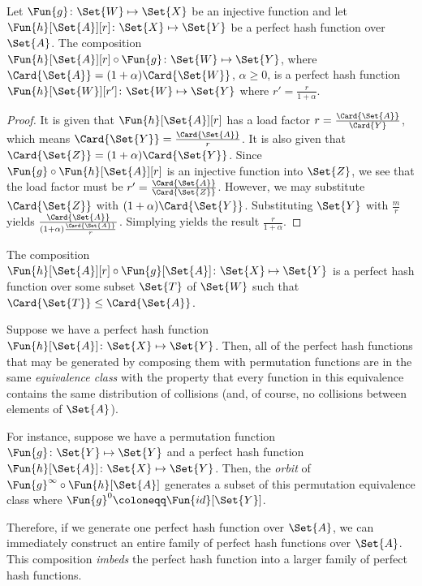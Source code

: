 \documentclass[ ../main.tex]{subfiles}
\begin{document}
\begin{theorem}
	Let $\Fun{g} \colon \Set{W} \mapsto \Set{X}$ be an injective function and let $\Fun{h}[\Set{A}][r] \colon \Set{X} 
	\mapsto \Set{Y}$ be a perfect hash function over $\Set{A}$.
	The composition $\Fun{h}[\Set{A}][r] \circ \Fun{g} \colon \Set{W} \mapsto \Set{Y}$, where $\Card{\Set{A}} = (1 + \alpha) \Card{\Set{W}}$, $\alpha \geq 0$, is a perfect hash function $\Fun{h}[\Set{W}][r'] \colon \Set{W} \mapsto \Set{Y}$ where $r' = \frac{r}{1+\alpha}$.
\end{theorem}
\begin{proof}
	It is given that $\Fun{h}[\Set{A}][r]$ has a load factor $r = \frac{\Card{\Set{A}}}{\Card{Y}}$, which means $\Card{\Set{Y}} = \frac{\Card{\Set{A}}}{r}$.
	It is also given that $\Card{\Set{Z}} = (1+\alpha) \Card{\Set{Y}}$.
	Since $\Fun{g} \circ \Fun{h}[\Set{A}][r]$ is an injective function into $\Set{Z}$, we see that the load factor must be $r' = \frac{\Card{\Set{A}}}{\Card{\Set{Z}}}$.
	However, we may substitute $\Card{\Set{Z}}$ with $(1+\alpha) \Card{\Set{Y}}$.
	Substituting $\Set{Y}$ with $\frac{m}{r}$ yields $\frac{\Card{\Set{A}}}{(1 + \alpha) \frac{\Card{\Set{A}}}{r}}$.
	Simplying yields the result $\frac{r}{1+\alpha}$.
\end{proof}

\begin{corollary}
	The composition $\Fun{h}[\Set{A}][r] \circ \Fun{g}[\Set{A}] \colon \Set{X} \mapsto \Set{Y}$ is a perfect hash function over some subset $\Set{T}$ of $\Set{W}$ such that $\Card{\Set{T}} \leq \Card{\Set{A}}$.
\end{corollary}

Suppose we have a perfect hash function $\Fun{h}[\Set{A}] \colon \Set{X} \mapsto \Set{Y}$.
Then, all of the perfect hash functions that may be generated by composing them with permutation functions are in the same \emph{equivalence class} with the property that every function in this equivalence contains the same distribution of collisions (and, of course, no collisions between elements of $\Set{A}$).

For instance, suppose we have a permutation function $\Fun{g} \colon \Set{Y} \mapsto \Set{Y}$ and a perfect hash function $\Fun{h}[\Set{A}] \colon \Set{X} \mapsto \Set{Y}$.
Then, the \emph{orbit} of $\Fun{g}^\infty \circ \Fun{h}[\Set{A}]$ generates a subset of this permutation equivalence class where $\Fun{g}^0 \coloneqq \Fun{id}[\Set{Y}]$.

Therefore, if we generate one perfect hash function over $\Set{A}$, we can immediately construct an entire family of perfect hash functions over $\Set{A}$.
This composition \emph{imbeds} the perfect hash function into a larger family of perfect hash functions.
\end{document}
